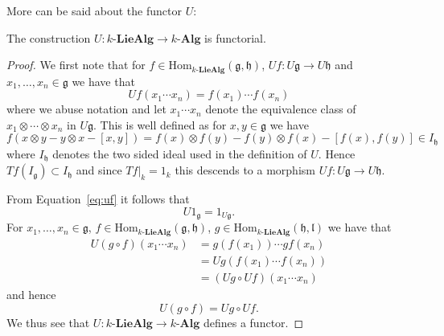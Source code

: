 More can be said about the functor $ U $:
\begin{lemma}
  \label{lem:ufunct}
  The construction $ U:k\text{-}\mathbf{LieAlg} \to k\text{-}\mathbf{Alg} $ is functorial.
\end{lemma}
\begin{proof}
  We first note that for $ f \in \text{Hom}_{k\text{-}\mathbf{LieAlg}}(\mathfrak{g}, \mathfrak{h}) $, $ Uf: U\mathfrak{g} \to U\mathfrak{h} $ and $ x_1, \ldots, x_n \in \mathfrak{g} $ we have that
  \begin{equation}
    Uf(x_1\cdots x_n) = f(x_1)\cdots f(x_n)
    \label{eq:uf}
  \end{equation}
  where we abuse notation and let $ x_1\cdots x_n $ denote the equivalence class of $ x_1 \otimes \cdots \otimes x_n $ in $ U\mathfrak{g} $.
  This is well defined as for $ x,y \in \mathfrak{g} $ we have
  \begin{equation*}
    f(x \otimes y - y \otimes x - [x,y]) = f(x) \otimes f(y) - f(y) \otimes f(x) - [f(x), f(y)] \in I_{\mathfrak{h}}
  \end{equation*}
  where $ I_{\mathfrak{h}} $ denotes the two sided ideal used in the definition of $ U $. Hence $ Tf(I_\mathfrak{g}) \subset I_\mathfrak{h} $ and since $ Tf|_k = 1_k $ this descends to a morphism $ Uf:U\mathfrak{g} \to U\mathfrak{h} $.

  From Equation~\ref{eq:uf} it follows that
  \begin{equation*}
    U 1_{\mathfrak{g}} = 1_{U\mathfrak{g}}.
  \end{equation*}
  For $ x_1, \ldots, x_n \in \mathfrak{g} $, $ f \in \text{Hom}_{k\text{-}\mathbf{LieAlg}}(\mathfrak{g}, \mathfrak{h})  $, $  g \in \text{Hom}_{k\text{-}\mathbf{LieAlg}}(\mathfrak{h}, \mathfrak{l})  $ we have that
  \begin{align*}
    U(g \circ f)(x_1 \cdots x_n) &= g(f(x_1)) \cdots gf(x_n) \\
                                                     &= Ug(f(x_1) \cdots f(x_n)) \\
                                                     &= (Ug \circ Uf)(x_1 \cdots x_n)
  \end{align*}
  and hence
  \begin{equation}
    U(g \circ f) = Ug \circ Uf
  .\end{equation}
  We thus see that $ U:k\text{-}\mathbf{LieAlg} \to k\text{-}\mathbf{Alg} $ defines a functor.
\end{proof}

